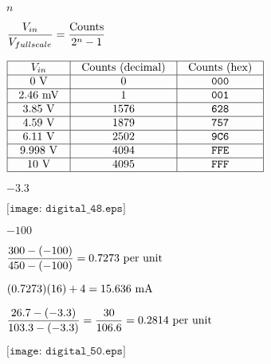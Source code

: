 \documentclass[12pt,a4paper,margin=2cm]{book}
\def\lthtmlcheckvsize{\ifdim\ht\sizebox<\vsize 
  \ifdim\wd\sizebox<\hsize\expandafter\hfill\fi \expandafter\vfill
  \else\expandafter\vss\fi}%
\begin{document}
{\newpage\clearpage
{}%
$ n$%
\lthtmlindisplaymathZ
\lthtmlcheckvsize\clearpage}

{\newpage\clearpage
{}%
$\displaystyle {V_{in} \over V_{fullscale}} = {\hbox{Counts} \over 2^n - 1}$%
\lthtmlindisplaymathZ
\lthtmlcheckvsize\clearpage}

{\newpage\clearpage
{}%
$\displaystyle \vbox{\offinterlineskip
\halign{\strut
\vrule \quad\hfil # \  \hfil & 
\vrule \quad\hfil # \  \hfil & 
\vrule \quad\hfil # \  \hfil \vrule \cr
\noalign{\hrule }
$V_{in}$ & Counts (decimal) & Counts (hex) \cr
\noalign{\hrule }
0 V & 0 & \texttt{000} \cr
\noalign{\hrule }
2.46 mV & 1 & \texttt{001} \cr
\noalign{\hrule }
3.85 V & 1576 & \texttt{628} \cr
\noalign{\hrule }
4.59 V & 1879 & \texttt{757} \cr
\noalign{\hrule }
6.11 V & 2502 & \texttt{9C6} \cr
\noalign{\hrule }
9.998 V & 4094 & \texttt{FFE} \cr
\noalign{\hrule }
10 V & 4095 & \texttt{FFF} \cr
\noalign{\hrule }
} %
}$%
\lthtmlindisplaymathZ
\lthtmlcheckvsize\clearpage}

{\newpage\clearpage
{}%
$ -3.3$%
\lthtmlindisplaymathZ
\lthtmlcheckvsize\clearpage}

{\newpage\clearpage
{}%
$\displaystyle \texttt{[image: digital\_48.eps]}$%
\lthtmlindisplaymathZ
\lthtmlcheckvsize\clearpage}

{\newpage\clearpage
{}%
$ -100$%
\lthtmlindisplaymathZ
\lthtmlcheckvsize\clearpage}

{\newpage\clearpage
{}%
$\displaystyle {300 - (-100) \over 450 - (-100)} = 0.7273 \hbox{ per unit}$%
\lthtmlindisplaymathZ
\lthtmlcheckvsize\clearpage}

{\newpage\clearpage
{}%
$\displaystyle (0.7273)(16) + 4 = 15.636 \hbox{ mA}$%
\lthtmlindisplaymathZ
\lthtmlcheckvsize\clearpage}

{\newpage\clearpage
{}%
$\displaystyle {{26.7 - (-3.3)} \over {103.3 - (-3.3)}} = {30 \over 106.6} = 0.2814 \hbox{ per unit}$%
\lthtmlindisplaymathZ
\lthtmlcheckvsize\clearpage}

{\newpage\clearpage
{}%
$\displaystyle \texttt{[image: digital\_50.eps]}$%
\lthtmlindisplaymathZ
\lthtmlcheckvsize\clearpage}
\end{document}
